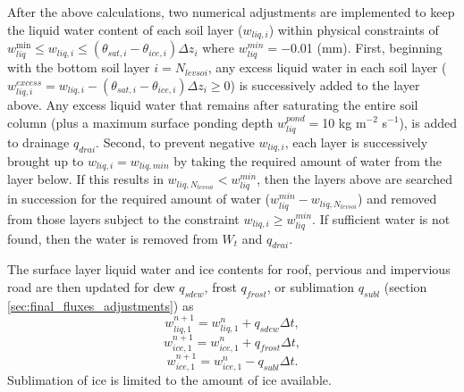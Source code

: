 \documentclass[12pt,authoryear]{elsarticle}
\numberwithin{equation}{section} %
\begin{document}
After the above calculations, two numerical adjustments are implemented to keep the liquid water content of each soil layer ($w_{liq,i}$) within physical constraints of $w_{liq}^{\min}\leq w_{liq,i}\leq(\theta_{sat,i}-\theta_{ice,i})\Delta z_{i}$ where $w_{liq}^{min}=-$0.01 (mm). First, beginning with the bottom soil layer $i=N_{levsoi}$, any excess liquid water in each soil layer ($w_{liq,i}^{excess}=w_{liq,i}-(\theta_{sat,i}-\theta_{ice,i})\Delta z_{i}\geq$0) is successively added to the layer above. Any excess liquid water that remains after saturating the entire soil column (plus a maximum surface ponding depth $w_{liq}^{pond}=$10 kg m$^{-2}$ s$^{-1}$), is added to drainage $q_{drai}$. Second, to prevent negative $w_{liq,i}$, each layer is successively brought up to $w_{liq,i}=w_{liq,min}$ by taking the required amount of water from the layer below. If this results in $w_{liq,N_{levsoi}}<w_{liq}^{min}$, then the layers above are searched in succession for the required amount of water ($w_{liq}^{min}-w_{liq,N_{levsoi}}$) and removed from those layers subject to the constraint $w_{liq,i}\geq w_{liq}^{min}$. If sufficient water is not found, then the water is removed from $W_{t}$ and $q_{drai}$. 

The surface layer liquid water and ice contents for roof, pervious and impervious road are then updated for dew $q_{sdew}$, frost $q_{frost}$, or sublimation $q_{subl}$ (section \ref{sec:final_fluxes_adjustments}) as
\begin{equation}
w_{liq,1}^{n+1} = w_{liq,1}^{n}+q_{sdew}\Delta t,
\end{equation}
\begin{equation}
w_{ice,1}^{n+1} = w_{ice,1}^{n}+q_{frost}\Delta t,
\end{equation}
\begin{equation}
w_{ice,1}^{n+1} = w_{ice,1}^{n}-q_{subl}\Delta t.
\end{equation}
Sublimation of ice is limited to the amount of ice available.

\end{document}
